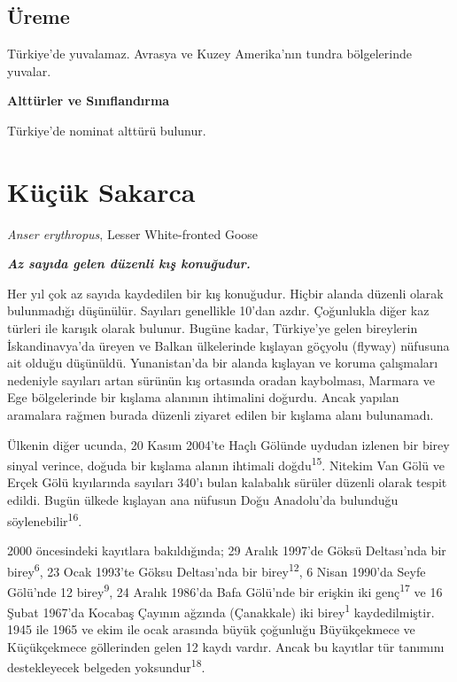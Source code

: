 \documentclass[
  letterpaper,
  DIV=11,
  numbers=noendperiod]{scrreprt}
\begin{document}
\hypertarget{uxfcreme-1}{%
\subsection{\texorpdfstring{\textbf{Üreme}}{Üreme}}\label{uxfcreme-1}}

Türkiye'de yuvalamaz. Avrasya ve Kuzey Amerika'nın tundra bölgelerinde
yuvalar.

\textbf{Alttürler ve Sınıflandırma}

Türkiye'de nominat alttürü bulunur.

\hypertarget{kuxfcuxe7uxfck-sakarca}{%
\section{Küçük Sakarca}\label{kuxfcuxe7uxfck-sakarca}}

\emph{Anser erythropus}, Lesser White-fronted Goose

\textbf{\emph{Az sayıda gelen düzenli kış konuğudur.}}

Her yıl çok az sayıda kaydedilen bir kış konuğudur. Hiçbir alanda
düzenli olarak bulunmadığı düşünülür. Sayıları genellikle 10'dan azdır.
Çoğunlukla diğer kaz türleri ile karışık olarak bulunur. Bugüne kadar,
Türkiye'ye gelen bireylerin İskandinavya'da üreyen ve Balkan ülkelerinde
kışlayan göçyolu (flyway) nüfusuna ait olduğu düşünüldü. Yunanistan'da
bir alanda kışlayan ve koruma çalışmaları nedeniyle sayıları artan
sürünün kış ortasında oradan kaybolması, Marmara ve Ege bölgelerinde bir
kışlama alanının ihtimalini doğurdu. Ancak yapılan aramalara rağmen
burada düzenli ziyaret edilen bir kışlama alanı bulunamadı.

Ülkenin diğer ucunda, 20 Kasım 2004'te Haçlı Gölünde uydudan izlenen bir
birey sinyal verince, doğuda bir kışlama alanın ihtimali
doğdu\textsuperscript{15}. Nitekim Van Gölü ve Erçek Gölü kıyılarında
sayıları 340'ı bulan kalabalık sürüler düzenli olarak tespit edildi.
Bugün ülkede kışlayan ana nüfusun Doğu Anadolu'da bulunduğu
söylenebilir\textsuperscript{16}.

2000 öncesindeki kayıtlara bakıldığında; 29 Aralık 1997'de Göksü
Deltası'nda bir birey\textsuperscript{6}, 23 Ocak 1993'te Göksu
Deltası'nda bir birey\textsuperscript{12}, 6 Nisan 1990'da Seyfe
Gölü'nde 12 birey\textsuperscript{9}, 24 Aralık 1986'da Bafa Gölü'nde
bir erişkin iki genç\textsuperscript{17} ve 16 Şubat 1967'da Kocabaş
Çayının ağzında (Çanakkale) iki birey\textsuperscript{1} kaydedilmiştir.
1945 ile 1965 ve ekim ile ocak arasında büyük çoğunluğu Büyükçekmece ve
Küçükçekmece göllerinden gelen 12 kaydı vardır. Ancak bu kayıtlar tür
tanımını destekleyecek belgeden yoksundur\textsuperscript{18}.
\end{document}
